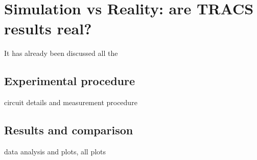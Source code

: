 \chapter{Simulation vs Reality: are TRACS results real?}

It has already been discussed all the 


\section{Experimental procedure} %
\label{sec:future_improvements}

circuit details and measurement procedure


\section{Results and comparison} %
\label{sec:future_proyection}

data analysis and plots, all plots 


